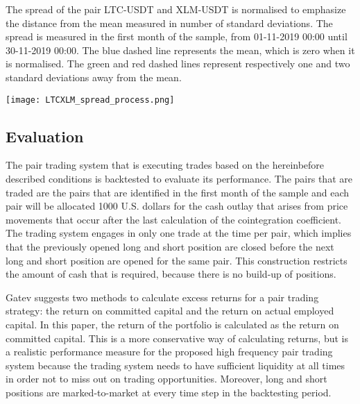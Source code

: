 \documentclass[12pt,english,authoryear]{article}
\begin{document}
\begin{center}
\begin{minipage}{\textwidth}
\caption*{\footnotesize The spread of the pair LTC-USDT and XLM-USDT is normalised to emphasize the distance from the mean measured in number of standard deviations. The spread is measured in the first month of the sample, from 01-11-2019 00:00 until 30-11-2019 00:00. The blue dashed line represents the mean, which is zero when it is normalised. The green and red dashed lines represent respectively one and two standard deviations away from the mean.}
\texttt{[image: LTCXLM\_spread\_process.png]}
\end{minipage}
\end{center}

\subsection{Evaluation} \label{sec:Johansen}

The pair trading system that is executing trades based on the hereinbefore described conditions is backtested to evaluate its performance. The pairs that are traded are the pairs that are identified in the first month of the sample and each pair will be allocated 1000 U.S. dollars for the cash outlay that arises from price movements that occur after the last calculation of the cointegration coefficient. The trading system engages in only one trade at the time per pair, which implies that the previously opened long and short position are closed before the next long and short position are opened for the same pair. This construction restricts the amount of cash that is required, because there is no build-up of positions. 

Gatev \citeyear{Gatev2006} suggests two methods to calculate excess returns for a pair trading strategy: the return on committed capital and the return on actual employed capital. In this paper, the return of the portfolio is calculated as the return on committed capital. This is a more conservative way of calculating returns, but is a realistic performance measure for the proposed high frequency pair trading system because the trading system needs to have sufficient liquidity at all times in order not to miss out on trading opportunities. Moreover, long and short positions are marked-to-market at every time step in the backtesting period. 
\end{document}
